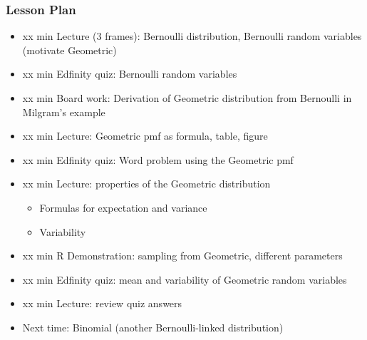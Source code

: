 \begin{frame}
    \frametitle{Lesson Plan}
    \begin{itemize}
        \item xx min Lecture (3 frames): Bernoulli distribution, Bernoulli random variables (motivate Geometric)
        \item xx min Edfinity quiz: Bernoulli random variables
        \item xx min Board work: Derivation of Geometric distribution from Bernoulli in Milgram's example
        \item xx min Lecture: Geometric pmf as formula, table, figure
        \item xx min Edfinity quiz: Word problem using the Geometric pmf
        \item xx min Lecture: properties of the Geometric distribution
        \begin{itemize}
            \item Formulas for expectation and variance
            \item Variability
        \end{itemize}
        \item xx min R Demonstration: sampling from Geometric, different parameters
        \item xx min Edfinity quiz: mean and variability of Geometric random variables
        \item xx min Lecture: review quiz answers
        \item Next time: Binomial (another Bernoulli-linked distribution)
    \end{itemize}
\end{frame}

